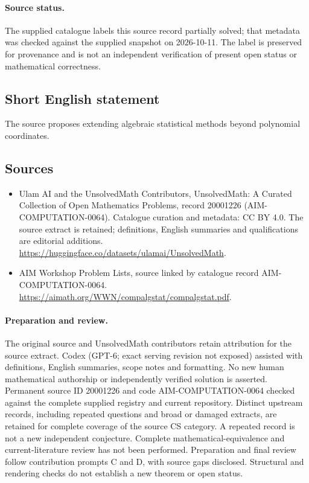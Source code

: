 \documentclass[11pt]{article}
\begin{document}
\paragraph{Source status.}
The supplied catalogue labels this source record partially solved; that metadata was checked against the supplied snapshot on 2026-10-11. The label is preserved for provenance and is not an independent verification of present open status or mathematical correctness.
\subsection{Short English statement}
The source proposes extending algebraic statistical methods beyond polynomial coordinates.
\subsection{Sources}
\begin{itemize}
\item[\hypertarget{source:20001226:1}{S1}] Ulam AI and the UnsolvedMath Contributors, UnsolvedMath: A Curated Collection of Open Mathematics Problems, record 20001226 (AIM-COMPUTATION-0064). Catalogue curation and metadata: CC BY 4.0. The source extract is retained; definitions, English summaries and qualifications are editorial additions.
\url{https://huggingface.co/datasets/ulamai/UnsolvedMath}.
\item[\hypertarget{source:20001226:2}{S2}] AIM Workshop Problem Lists, source linked by catalogue record AIM-COMPUTATION-0064.
\url{https://aimath.org/WWN/compalgstat/compalgstat.pdf}.
\end{itemize}
\paragraph{Preparation and review.}
The original source and UnsolvedMath contributors retain attribution for the source extract. Codex (GPT-6; exact serving revision not exposed) assisted with definitions, English summaries, scope notes and formatting. No new human mathematical authorship or independently verified solution is asserted. Permanent source ID 20001226 and code AIM-COMPUTATION-0064 checked against the complete supplied registry and current repository. Distinct upstream records, including repeated questions and broad or damaged extracts, are retained for complete coverage of the source CS category. A repeated record is not a new independent conjecture. Complete mathematical-equivalence and current-literature review has not been performed. Preparation and final review follow contribution prompts C and D, with source gaps disclosed. Structural and rendering checks do not establish a new theorem or open status.
\label{end:20001226}
\end{document}
